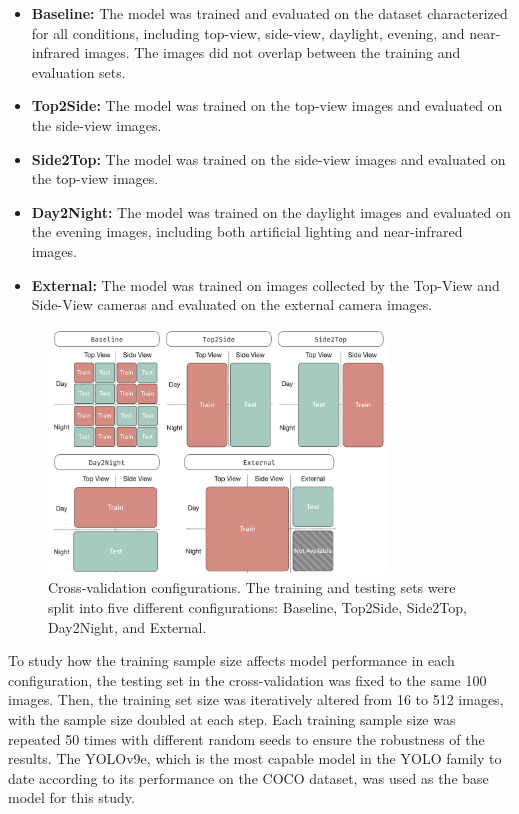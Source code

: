 \begin{itemize}
    \item \textbf{Baseline:} The model was trained and evaluated on the dataset characterized for all conditions, including top-view, side-view, daylight, evening, and near-infrared images. The images did not overlap between the training and evaluation sets.
    \item \textbf{Top2Side:} The model was trained on the top-view images and evaluated on the side-view images.
    \item \textbf{Side2Top:} The model was trained on the side-view images and evaluated on the top-view images.
    \item \textbf{Day2Night:} The model was trained on the daylight images and evaluated on the evening images, including both artificial lighting and near-infrared images.
    \item \textbf{External:} The model was trained on images collected by the Top-View and Side-View cameras and evaluated on the external camera images.
\end{itemize}

\begin{figure}[h]
    \centering
    \includegraphics[width=0.8\textwidth]{figure_2.jpg}
    \caption{Cross-validation configurations. The training and testing sets were split into five different configurations: Baseline, Top2Side, Side2Top, Day2Night, and External.}
    \label{fig:splits}
\end{figure}

To study how the training sample size affects model performance in each configuration, the testing set in the cross-validation was fixed to the same 100 images. Then, the training set size was iteratively altered from 16 to 512 images, with the sample size doubled at each step. Each training sample size was repeated 50 times with different random seeds to ensure the robustness of the results. The YOLOv9e, which is the most capable model in the YOLO family to date according to its performance on the COCO dataset, was used as the base model for this study.

